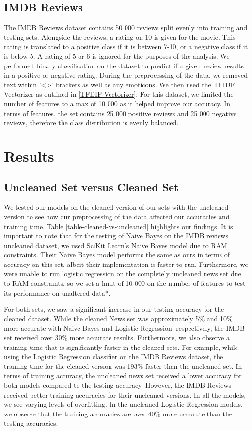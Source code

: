 \documentclass{homework}
\begin{document}
\subsection{IMDB Reviews}
The IMDB Reviews dataset contains 50 000 reviews split evenly into training and testing sets. Alongside the reviews, a rating on 10 is given for the movie. This rating is translated to a positive class if it is between 7-10, or a negative class if it is below 5. A rating of 5 or 6 is ignored for the purposes of the analysis. We performed binary classification on the dataset to predict if a given review results in a positive or negative rating. During the preprocessing of the data, we removed text within '<>' brackets as well as any emoticons. We then used the TFIDF Vectorizer as outlined in \ref{TFDIF Vectorizer}. For this dataset, we limited the number of features to a max of 10 000 as it helped improve our accuracy. In terms of features, the set contains 25 000 positive reviews and 25 000 negative reviews, therefore the class distribution is evenly balanced.

\section{Results}

\subsection{Uncleaned Set versus Cleaned Set}
We tested our models on the cleaned version of our sets with the uncleaned version to see how our preprocessing of the data affected our accuracies and training time. Table \ref{table-cleaned-vs-uncleaned} highlights our findings. It is important to note that for the testing of Naive Bayes on the IMDB reviews uncleaned dataset, we used SciKit Learn's Naive Bayes model due to RAM constraints. Their Naive Bayes model performs the same as ours in terms of accuracy on this set, albeit their implementation is faster to run. Furthermore, we were unable to run logistic regression on the completely uncleaned news set due to RAM constraints, so we set a limit of 10 000 on the number of features to test its performance on unaltered data*.

For both sets, we saw a significant increase in our testing accuracy for the cleaned dataset. While the cleaned News set was approximately 5\% and 10\% more accurate with Naive Bayes and Logistic Regression, respectively, the IMDB set received over 30\% more accurate results. Furthermore, we also observe a training time that is significantly faster in the cleaned sets. For example, while using the Logistic Regression classifier on the IMDB Reviews dataset, the training time for the cleaned version was 193\% faster than the uncleaned set. In terms of training accuracy, the uncleaned news set received a lower accuracy for both models compared to the testing accuracy. However, the IMDB Reviews received better training accuracies for their uncleaned versions. In all the models, we see varying levels of overfitting. In the uncleaned Logistic Regression models, we observe that the training accuracies are over 40\% more accurate than the testing accuracies.
\end{document}
